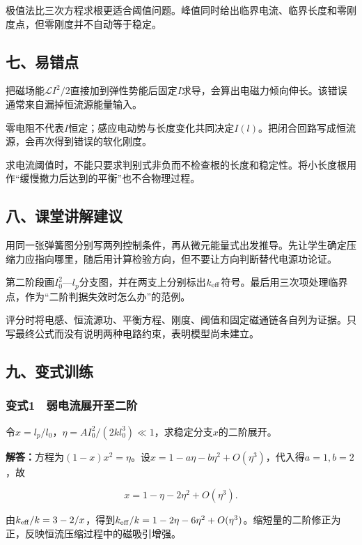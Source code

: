 \documentclass[12pt,a4paper,fontset=fandol]{ctexart}
\begin{document}
极值法比三次方程求根更适合阈值问题。峰值同时给出临界电流、临界长度和零刚度点，但零刚度并不自动等于稳定。

\subsection{七、易错点}\label{ux4e03ux6613ux9519ux70b9-1}

把磁场能\(\mathcal LI^2/2\)直接加到弹性势能后固定\(I\)求导，会算出电磁力倾向伸长。该错误通常来自漏掉恒流源能量输入。

零电阻不代表\(I\)恒定；感应电动势与长度变化共同决定\(I(l)\)。把闭合回路写成恒流源，会再次得到错误的软化刚度。

求电流阈值时，不能只要求判别式非负而不检查根的长度和稳定性。将小长度根用作``缓慢撤力后达到的平衡''也不合物理过程。

\subsection{八、课堂讲解建议}\label{ux516bux8bfeux5802ux8bb2ux89e3ux5efaux8bae-1}

用同一张弹簧图分别写两列控制条件，再从微元能量式出发推导。先让学生确定压缩力应指向哪里，随后用计算检验方向，但不要让方向判断替代电源功论证。

第二阶段画\(I_0^2\)---\(l_p\)分支图，并在两支上分别标出\(k_{\rm eff}\)符号。最后用三次项处理临界点，作为``二阶判据失效时怎么办''的范例。

评分时将电感、恒流源功、平衡方程、刚度、阈值和固定磁通链各自列为证据。只写最终公式而没有说明两种电路约束，表明模型尚未建立。

\subsection{九、变式训练}\label{ux4e5dux53d8ux5f0fux8badux7ec3-1}

\subsubsection{变式1　弱电流展开至二阶}\label{ux53d8ux5f0f1-ux5f31ux7535ux6d41ux5c55ux5f00ux81f3ux4e8cux9636}

令\(x=l_p/l_0\)，\(\eta=AI_0^2/(2kl_0^3)\ll1\)，求稳定分支\(x\)的二阶展开。

\textbf{解答：}方程为\((1-x)x^2=\eta\)。设\(x=1-a\eta-b\eta^2+O(\eta^3)\)，代入得\(a=1,b=2\)，故

\[
x=1-\eta-2\eta^2+O(\eta^3).
\]

由\(k_{\rm eff}/k=3-2/x\)，得到\(k_{\rm eff}/k=1-2\eta-6\eta^2+O(\eta^3)\)。缩短量的二阶修正为正，反映恒流压缩过程中的磁吸引增强。
\end{document}
